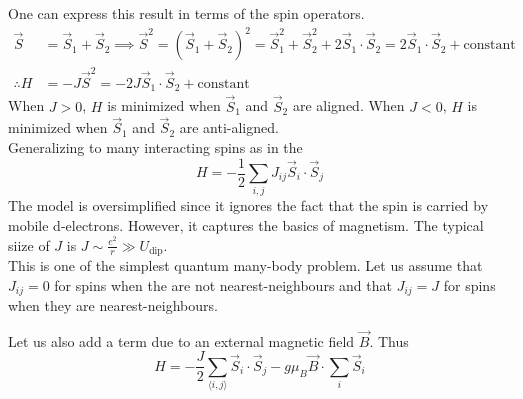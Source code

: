 \documentclass[12pt,a4paper,titlepage]{article}
\newcommand{\trm}[1]{\textrm{#1}} %
\newcommand{\ul}[1]{\underline{\smash{#1}}} %
\begin{document}
One can express this result in terms of the spin operators.
\begin{equation}
\begin{aligned}
\vec{S}&=\vec{S}_{1}+\vec{S}_{2}\implies \vec{S}^{2}=(\vec{S}_{1}+\vec{S}_{2})^{2}=\vec{S}_{1}^{2}+\vec{S}_{2}^{2}+2\vec{S}_{1}\cdot\vec{S}_{2}=2\vec{S}_{1}\cdot\vec{S}_{2}+\trm{constant}\\
\therefore H&=-J\vec{S}^{2}=-2J\vec{S}_{1}\cdot\vec{S}_{2}+\trm{constant}
\end{aligned}
\end{equation}
When $J>0$, $H$ is minimized when $\vec{S}_{1}$ and $\vec{S}_{2}$ are aligned. When $J<0$, $H$ is minimized when $\vec{S}_{1}$ and $\vec{S}_{2}$ are anti-aligned.\\

Generalizing to many interacting spins as in the \ul{Heisenberg model}
\begin{equation}
H=-\frac{1}{2}\sum_{i,j}J_{ij}\vec{S}_{i}\cdot\vec{S}_{j}
\end{equation}
The model is oversimplified since it ignores the fact that the spin is carried by mobile d-electrons. However, it captures the basics of magnetism. The typical siize of $J$ is $J\sim\frac{e^{2}}{r}\gg U_{\trm{dip}}$.\\

This is one of the simplest quantum many-body problem. Let us assume that $J_{ij}=0$ for spins when the are not nearest-neighbours and that $J_{ij}=J$ for spins when they are nearest-neighbours. 
\begin{center}
\end{center}
Let us also add a term due to an external magnetic field $\vec{B}$. Thus
\begin{equation}
H=-\frac{J}{2}\sum_{\langle i,j\rangle}\vec{S}_{i}\cdot\vec{S}_{j}-g\mu_{B}\vec{B}\cdot\sum_{i}\vec{S}_{i}
\end{equation}
\end{document}
